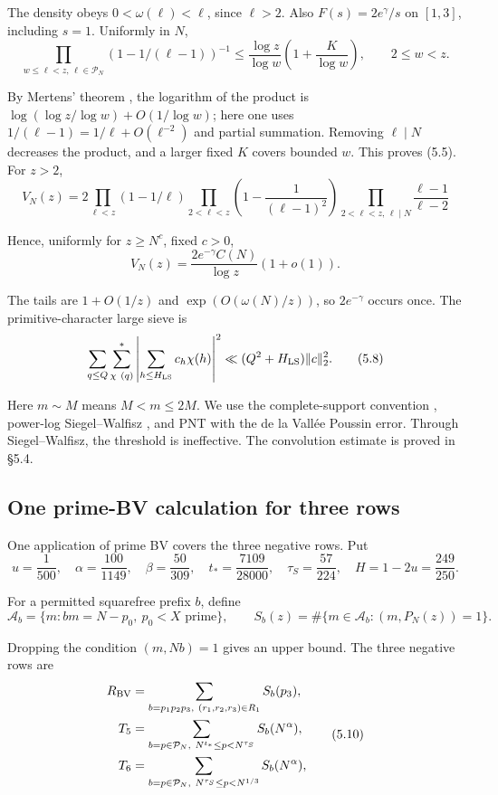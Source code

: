 The density obeys $0<\omega(\ell)<\ell$, since $\ell>2$.
Also $F(s)=2e^\gamma/s$ on $[1,3]$, including $s=1$.
Uniformly in $N$,
\[
 \prod_{w\le\ell<z,\,\ell\in\mathcal P_N}
 (1-1/(\ell-1))^{-1}
 \le\frac{\log z}{\log w}\left(1+\frac K{\log w}\right),\qquad 2\le w<z.
\tag{5.5}
\]

By Mertens' theorem \cite{Mertens1874}, the logarithm of the product is
$\log(\log z/\log w)+O(1/\log w)$;
here one uses $1/(\ell-1)=1/\ell+O(\ell^{-2})$ and partial summation.
Removing $\ell\mid N$ decreases the product,
and a larger fixed $K$ covers bounded $w$.
This proves (5.5).
For $z>2$,
\[
 V_N(z)=2\prod_{\ell<z}(1-1/\ell)
 \prod_{2<\ell<z}\left(1-\frac1{(\ell-1)^2}\right)
 \prod_{2<\ell<z,\,\ell\mid N}\frac{\ell-1}{\ell-2}
\tag{5.6}
\]

Hence, uniformly for $z\ge N^c$, fixed $c>0$,
\[
 V_N(z)=\frac{2e^{-\gamma}C(N)}{\log z}(1+o(1)).
\tag{5.7}
\]

The tails are $1+O(1/z)$ and $\exp(O(\omega(N)/z))$,
so $2e^{-\gamma}$ occurs once.
The primitive-character large sieve \cite[(2.19)]{Z1} is
\[
 \sum_{q\le Q}\sum_{\chi\ (q)}^*
 \left|\sum_{h\le H_{\rm LS}}c_h\chi(h)\right|^2
 \ll (Q^2+H_{\rm LS})\|c\|_2^2.
\tag{5.8}
\]

Here $m\sim M$ means $M<m\le2M$.
We use the complete-support convention \cite[(2.15)--(2.17)]{Z1},
power-log Siegel--Walfisz \cite[(2.21)]{Z1},
and PNT with the de la Vallée Poussin error.
Through Siegel--Walfisz, the threshold is ineffective.
The convolution estimate is proved in \S{}5.4.

\subsection{One prime-BV calculation for three rows}

One application of prime BV covers the three negative rows. Put
\[
 u=\frac1{500},\quad \alpha=\frac{100}{1149},\quad
 \beta=\frac{50}{309},\quad t_* =\frac{7109}{28000},\quad
 \tau_S=\frac{57}{224},\quad H=1-2u=\frac{249}{250}.
\]

For a permitted squarefree prefix $b$, define
\begingroup\small
\[
 \mathcal A_b=\{m:bm=N-p_0,\ p_0<X\text{ prime}\},\qquad
 S_b(z)=\#\{m\in\mathcal A_b:(m,P_N(z))=1\}.
\tag{5.9}
\]

\endgroup
Dropping the condition $(m,Nb)=1$ gives an upper bound.
The three negative rows are
\[
 \begin{aligned}
 R_{\rm BV}&=\sum_{b=p_1p_2p_3,\ (r_1,r_2,r_3)\in R_1}S_b(p_3),\\
 T_5&=\sum_{b=p\in\mathcal P_N,\ N^{t_*}\le p<N^{\tau_S}}S_b(N^\alpha),\\
 T_6&=\sum_{b=p\in\mathcal P_N,\ N^{\tau_S}\le p<N^{1/3}}S_b(N^\alpha),
 \end{aligned}
\tag{5.10}
\]

